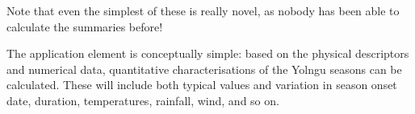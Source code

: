 Note that even the simplest of these is really novel, as nobody has
been able to calculate the summaries before!

The application element is conceptually simple:  based on the physical
descriptors and numerical data, quantitative characterisations of the
Yolngu seasons can be calculated.  These will include both typical values
and variation in season onset date, duration, temperatures, rainfall,
wind, and so on.





